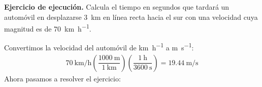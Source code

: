 \documentclass[12pt, letter]{exam}
\begin{document}
\begin{questions}
    \setcounter{question}{4} \question \label{Ejercicio_03} \textbf{Ejercicio de ejecución. } Calcula el tiempo en segundos que tardará un automóvil en desplazarse \SI{3}{\kilo\meter} en línea recta hacia el sur con una velocidad cuya magnitud es de \SI{70}{\kilo\meter\per\hour}.

    \vspace*{0.25cm}
    Convertimos la velocidad del automóvil de \unit{\kilo\meter\per\hour} a \unit{\meter\per\second}:
    \begin{align*}
        \SI[per-mode=fraction]{70}{\kilo\meter\per\hour} \left( \dfrac{\SI{1000}{\meter}}{\SI{1}{\kilo\meter}} \right) \left( \dfrac{\SI{1}{\hour}}{\SI{3600}{\second}} \right) = \SI[per-mode=fraction]{19.44}{\meter\per\second}
    \end{align*}
    Ahora pasamos a resolver el ejercicio:


\end{questions}
\end{document}
